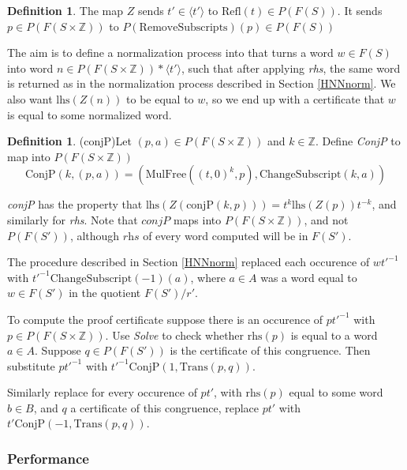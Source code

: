 \documentclass[11pt]{article} %
\theoremstyle{definition}
\theoremstyle{definition}
\theoremstyle{definition}
\theoremstyle{definition}
\theoremstyle{definition}
\newtheorem{defn}[theorem]{Definition}
\theoremstyle{definition}
\begin{document}
\begin{defn}
  The map $Z$ sends $t' \in \langle t' \rangle$ to $\text{Refl}(t) \in P(F(S))$.
  It sends $p \in P(F(S \times \mathbb{Z}))$ to $P(\text{RemoveSubscripts})(p) \in P(F(S))$
\end{defn}

The aim is to define a normalization process into that turns a word $w \in F(S)$ into
word $n \in P(F(S \times \mathbb{Z})) \ast \langle t' \rangle$,
such that after applying \textit{rhs}, the same word is returned as in the
normalization process described in Section \ref{HNNnorm}. We also want
$\text{lhs}(Z(n))$ to be equal to $w$, so we end up with a certificate that $w$
is equal to some normalized word.

\begin{defn}(conjP)\label{conjP}
  Let $(p, a) \in P(F(S \times \mathbb{Z}))$ and $k \in \mathbb{Z}$.
  Define \textit{ConjP} to map into $P(F(S \times \mathbb{Z}))$
  \begin{equation}
    \text{ConjP}(k, (p, a)) = (\text{MulFree}((t,0)^k, p), \text{ChangeSubscript}(k, a))
  \end{equation}
\end{defn}

\textit{conjP} has the property that $\text{lhs}(Z(\text{conjP}(k, p))) = t^k \text{lhs}(Z(p))t^{-k}$,
and similarly for \textit{rhs}. Note that $\textit{conjP}$ maps into $P(F(S \times \mathbb{Z}))$,
and not $P(F(S'))$, although $\textit{rhs}$ of every word computed
will be in $F(S')$.

The procedure described in Section \ref{HNNnorm}
replaced each occurence of $wt'^{-1}$ with \newline $t'^{-1}\text{ChangeSubscript}(-1)(a)$,
where $a \in A$ was a word equal to $w \in F(S')$ in the quotient
$F(S') / r'$.

To compute the proof certificate suppose there is an occurence of $pt'^{-1}$ with
$p \in P(F(S \times \mathbb{Z}))$. Use \textit{Solve} to check whether $\text{rhs}(p)$ is
equal to a word $a \in A$. Suppose $q \in  P(F(S'))$ is the certificate
of this congruence. Then substitute $pt'^{-1}$ with $t'^{-1}\text{ConjP}(1, \text{Trans}(p, q))$.

Similarly replace for every occurence of $pt'$, with $\text{rhs}(p)$ equal to some word $b \in B$,
and $q$ a certificate of this congruence, replace $pt'$ with $t'\text{ConjP}(-1, \text{Trans}(p, q))$.

\subsubsection{Performance}
\end{document}

